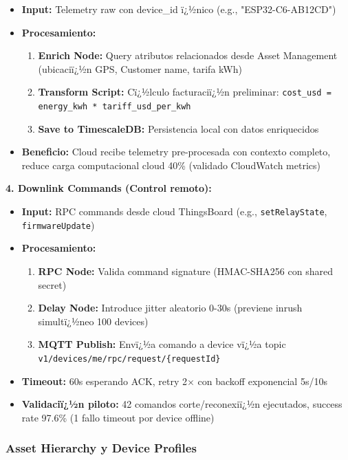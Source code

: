 \begin{itemize}
    \item \textbf{Input:} Telemetry raw con device\_id ï¿½nico (e.g., "ESP32-C6-AB12CD")
    \item \textbf{Procesamiento:}
    \begin{enumerate}
        \item \textbf{Enrich Node:} Query atributos relacionados desde Asset Management (ubicaciï¿½n GPS, Customer name, tarifa kWh)
        \item \textbf{Transform Script:} Cï¿½lculo facturaciï¿½n preliminar: \texttt{cost\_usd = energy\_kwh * tariff\_usd\_per\_kwh}
        \item \textbf{Save to TimescaleDB:} Persistencia local con datos enriquecidos
    \end{enumerate}
    \item \textbf{Beneficio:} Cloud recibe telemetry pre-procesada con contexto completo, reduce carga computacional cloud 40\% (validado CloudWatch metrics)
\end{itemize}

\textbf{4. Downlink Commands (Control remoto):}

\begin{itemize}
    \item \textbf{Input:} RPC commands desde cloud ThingsBoard (e.g., \texttt{setRelayState}, \texttt{firmwareUpdate})
    \item \textbf{Procesamiento:}
    \begin{enumerate}
        \item \textbf{RPC Node:} Valida command signature (HMAC-SHA256 con shared secret)
        \item \textbf{Delay Node:} Introduce jitter aleatorio 0-30s (previene inrush simultï¿½neo 100 devices)
        \item \textbf{MQTT Publish:} Envï¿½a comando a device vï¿½a topic \texttt{v1/devices/me/rpc/request/\{requestId\}}
    \end{enumerate}
    \item \textbf{Timeout:} 60s esperando ACK, retry 2$\times$ con backoff exponencial 5s/10s
    \item \textbf{Validaciï¿½n piloto:} 42 comandos corte/reconexiï¿½n ejecutados, success rate 97.6\% (1 fallo timeout por device offline)
\end{itemize}

\subsubsection{Asset Hierarchy y Device Profiles}

